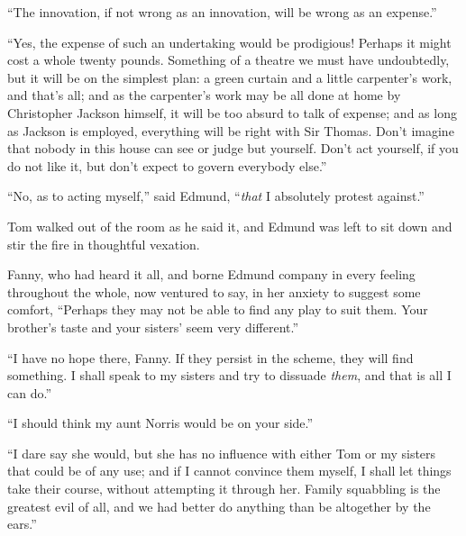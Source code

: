 ``The innovation, if not wrong as an innovation, will be
wrong as an expense.''

``Yes, the expense of such an undertaking would be prodigious!
Perhaps it might cost a whole twenty pounds.  Something of
a theatre we must have undoubtedly, but it will be on the
simplest plan:  a green curtain and a little carpenter's work,
and that's all; and as the carpenter's work may be all
done at home by Christopher Jackson himself, it will be
too absurd to talk of expense; and as long as Jackson
is employed, everything will be right with Sir Thomas.
Don't imagine that nobody in this house can see or judge
but yourself.  Don't act yourself, if you do not like it,
but don't expect to govern everybody else.''

``No, as to acting myself,'' said Edmund, ``\emph{that} I
absolutely protest against.''

Tom walked out of the room as he said it, and Edmund was
left to sit down and stir the fire in thoughtful vexation.

Fanny, who had heard it all, and borne Edmund company
in every feeling throughout the whole, now ventured to say,
in her anxiety to suggest some comfort, ``Perhaps they may
not be able to find any play to suit them.  Your brother's
taste and your sisters' seem very different.''

``I have no hope there, Fanny.  If they persist in the scheme,
they will find something.  I shall speak to my sisters
and try to dissuade \emph{them}, and that is all I can do.''

``I should think my aunt Norris would be on your side.''

``I dare say she would, but she has no influence with
either Tom or my sisters that could be of any use;
and if I cannot convince them myself, I shall let things
take their course, without attempting it through her.
Family squabbling is the greatest evil of all, and we had
better do anything than be altogether by the ears.''

